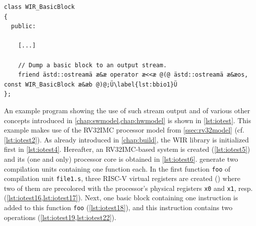 \begin{lstlisting}[style=code,float=h,caption={Generic Stream Output of Class \texttt{WIR\_BasicBlock}},label=lst:bbio]
class WIR_BasicBlock
{
  public:

    [...]

    // Dump a basic block to an output stream.
    friend ästd::ostreamä æ&æ operator æ<<æ @(@ ästd::ostreamä æ&æos, const WIR_BasicBlock æ&æb @)@;Ü\label{lst:bbio1}Ü
};
\end{lstlisting}

An example program showing the use of such stream output and of various other concepts introduced in \cref{chap:swmodel,chap:hwmodel} is shown in \cref{lst:iotest}.
This example makes use of the RV32IMC processor model from \cref{ssec:rv32model} (cf. \cref{lst:iotest2}).
As already introduced in \cref{chap:build}, the \gls{WIR} library is initialized first in \cref{lst:iotest4}.
Hereafter, an RV32IMC-based system is created (\cref{lst:iotest5}) and its (one and only) processor core is obtained in \cref{lst:iotest6}.
 generate two compilation units containing one function each.
In the first function \texttt{foo} of compilation unit \texttt{file1.s}, three RISC-V virtual registers are created () where two of them are precolored with the processor's physical registers \texttt{x0} and \texttt{x1}, resp. (\cref{lst:iotest16,lst:iotest17}).
Next, one basic block containing one instruction is added to this function \texttt{foo} (\cref{lst:iotest18}), and this instruction contains two operations (\cref{lst:iotest19,lst:iotest22}).

